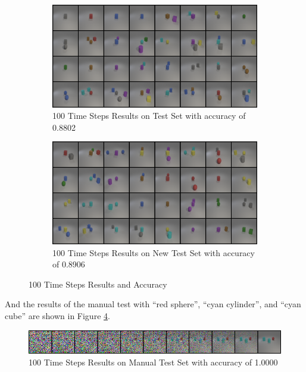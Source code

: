 \begin{figure}[h]
    \centering
    \begin{subfigure}{0.48\textwidth}
        \centering
        \includegraphics[width=\textwidth]{figures/step_100_test.png}
        \caption{100 Time Steps Results on Test Set with accuracy of 0.8802}
        \label{fig:step_100_test}
    \end{subfigure}
    \hfill
    \begin{subfigure}{0.48\textwidth}
        \centering
        \includegraphics[width=\textwidth]{figures/step_100_new_test.png}
        \caption{100 Time Steps Results on New Test Set with accuracy of 0.8906}
        \label{fig:step_100_new_test}
    \end{subfigure}
    \caption{100 Time Steps Results and Accuracy}
    \label{fig:step_100}
\end{figure}

And the results of the manual test with ``red sphere'', ``cyan cylinder'', and ``cyan cube'' are shown in Figure \ref{fig:step_100_manual}.
\begin{figure}[h]
    \centering
    \includegraphics[width=\textwidth]{figures/step_100_manual_test.png}
    \caption{100 Time Steps Results on Manual Test Set with accuracy of 1.0000}
    \label{fig:step_100_manual}
\end{figure}

